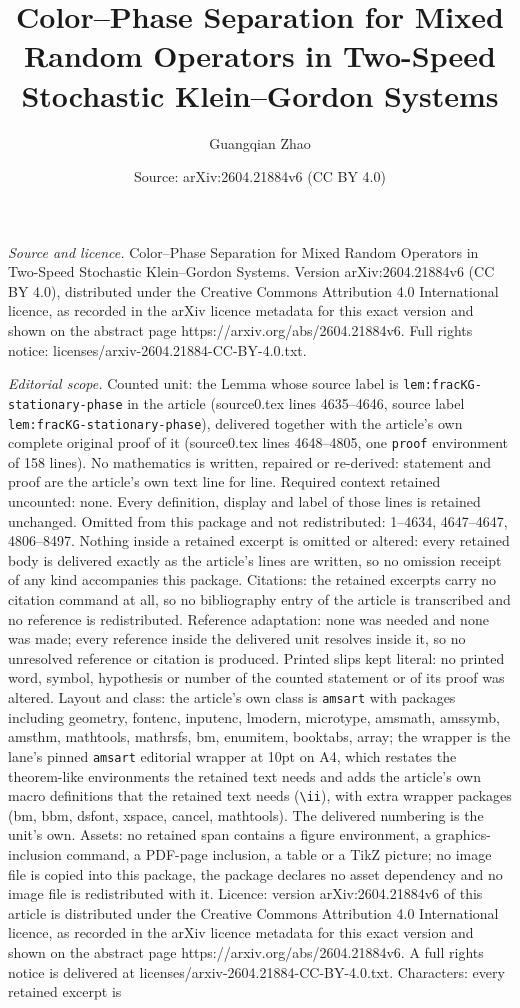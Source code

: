 \documentclass[10pt,a4paper]{amsart}
\title[Color--Phase Separation for Mixed Random Operators in Two-Sp]{Color--Phase Separation for Mixed Random Operators in Two-Speed Stochastic Klein--Gordon Systems}
\author{Guangqian Zhao}
\date{Source: arXiv:2604.21884v6 (CC BY 4.0)}
\begin{document}
\maketitle

\noindent\emph{Source and licence.} Color--Phase Separation for Mixed Random Operators in Two-Speed Stochastic Klein--Gordon Systems. Version arXiv:2604.21884v6 (CC BY 4.0), distributed under the Creative Commons Attribution 4.0 International licence, as recorded in the arXiv licence metadata for this exact version and shown on the abstract page https://arxiv.org/abs/2604.21884v6. Full rights notice: licenses/arxiv-2604.21884-CC-BY-4.0.txt.\par\smallskip

\noindent\textit{Editorial scope.} Counted unit: the Lemma whose source label is \texttt{lem:fracKG-stationary-phase} in the article (source0.tex lines 4635--4646, source label \texttt{lem:fracKG-stationary-phase}), delivered together with the article's own complete original proof of it (source0.tex lines 4648--4805, one \texttt{proof} environment of 158 lines). No mathematics is written, repaired or re-derived: statement and proof are the article's own text line for line. Required context retained uncounted: none. Every definition, display and label of those lines is retained unchanged. Omitted from this package and not redistributed: 1--4634, 4647--4647, 4806--8497. Nothing inside a retained excerpt is omitted or altered: every retained body is delivered exactly as the article's lines are written, so no omission receipt of any kind accompanies this package. Citations: the retained excerpts carry no citation command at all, so no bibliography entry of the article is transcribed and no reference is redistributed. Reference adaptation: none was needed and none was made; every reference inside the delivered unit resolves inside it, so no unresolved reference or citation is produced. Printed slips kept literal: no printed word, symbol, hypothesis or number of the counted statement or of its proof was altered. Layout and class: the article's own class is \texttt{amsart} with packages including geometry, fontenc, inputenc, lmodern, microtype, amsmath, amssymb, amsthm, mathtools, mathrsfs, bm, enumitem, booktabs, array; the wrapper is the lane's pinned \texttt{amsart} editorial wrapper at 10pt on A4, which restates the theorem-like environments the retained text needs and adds the article's own macro definitions that the retained text needs (\texttt{\textbackslash ii}), with extra wrapper packages (bm, bbm, dsfont, xspace, cancel, mathtools). The delivered numbering is the unit's own. Assets: no retained span contains a figure environment, a graphics-inclusion command, a PDF-page inclusion, a table or a TikZ picture; no image file is copied into this package, the package declares no asset dependency and no image file is redistributed with it. Licence: version arXiv:2604.21884v6 of this article is distributed under the Creative Commons Attribution 4.0 International licence, as recorded in the arXiv licence metadata for this exact version and shown on the abstract page https://arxiv.org/abs/2604.21884v6. A full rights notice is delivered at licenses/arxiv-2604.21884-CC-BY-4.0.txt. Characters: every retained excerpt is 
\end{document}
